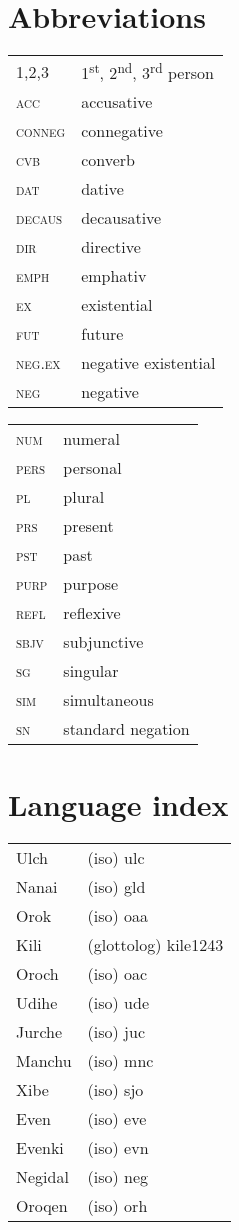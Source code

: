 \documentclass[output=paper]{langscibook}
\begin{document}
\section*{Abbreviations}
\begin{tabularx}{.45\textwidth}{lQ}
1,2,3 & 1\textsuperscript{st}, 2\textsuperscript{nd}, 3\textsuperscript{rd} person \\
\textsc{acc} & accusative\\
\textsc{conneg} & connegative\\
\textsc{cvb} & converb\\
\textsc{dat} & dative\\
\textsc{decaus} & decausative\\
\textsc{dir} & directive\\
\textsc{emph} & emphativ\\
\textsc{ex} & existential\\
\textsc{fut} & future\\
\textsc{neg.ex} & negative existential\\
\textsc{neg} & negative\\
\end{tabularx}
\begin{tabularx}{.45\textwidth}{lQ}
\textsc{num} & numeral\\
\textsc{pers} & personal\\
\textsc{pl} & plural\\
\textsc{prs} & present\\
\textsc{pst} & past\\
\textsc{purp} & purpose\\
\textsc{refl} & reflexive\\
\textsc{sbjv} & subjunctive\\
\textsc{sg} & singular\\
\textsc{sim} & simultaneous\\
\textsc{sn} & standard negation\\
\end{tabularx}

\section*{Language index}

\begin{tabularx}{.45\textwidth}{lQ}
    Ulch & (iso) ulc\\
    Nanai & (iso) gld\\
    Orok & (iso) oaa\\
    Kili & (glottolog) kile1243\\
    Oroch & (iso) oac\\
    Udihe & (iso) ude\\
    Jurche & (iso) juc\\
    Manchu & (iso) mnc\\
    Xibe & (iso) sjo\\
    Even & (iso) eve\\
    Evenki & (iso) evn\\
    Negidal & (iso) neg\\
    Oroqen & (iso) orh\\
\end{tabularx}
\end{document}
